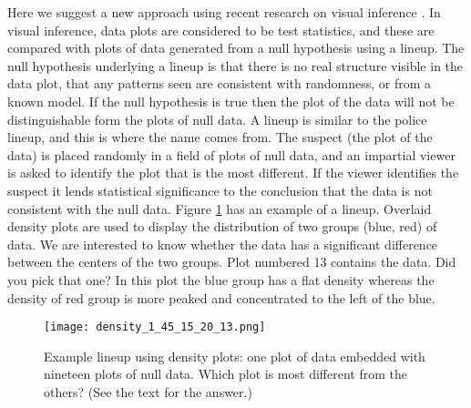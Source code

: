 

Here we suggest a new approach using recent research on visual inference \citep{buja:2009,wickham:2010}. In visual inference, data plots are considered to be test statistics, and these are compared with plots of data generated from a null hypothesis using a lineup. The null hypothesis underlying a lineup is that there is no real structure visible in the data plot, that any patterns seen are consistent with randomness, or from a known model. If the null hypothesis is true then the plot of the data will not be distinguishable form the plots of null data. A lineup is similar to the police lineup, and this is where the name comes from. The suspect (the plot of the data) is placed randomly in a field of plots of null data, and an impartial viewer is asked to identify the plot that is the most different. If the viewer identifies the suspect it lends statistical significance to the conclusion that the data is not consistent with the null data. Figure \ref{lineup} has an example of a lineup. Overlaid density plots are used to display the distribution of two groups (blue, red) of data. We are interested to know whether the data has a significant difference between the centers of the two groups. Plot numbered 13 contains the data. Did you pick that one? In this plot the blue group has a flat density whereas the density of red group is more peaked and concentrated to the left of the blue.

\begin{figure}[htbp]
   \centering
   \texttt{[image: density\_1\_45\_15\_20\_13.png]} 
   \caption{Example lineup using density plots: one plot of data
     embedded with nineteen plots of null data. Which plot is
     most different from the others? (See the text for the answer.)}
   \label{lineup}
\end{figure}

